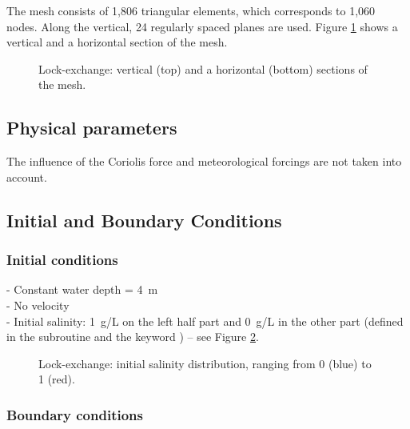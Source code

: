 The mesh consists of 1,806 triangular elements, which corresponds to 1,060 nodes.
Along the vertical, 24 regularly spaced planes are used.
Figure \ref{fig:lock-mesh} shows a vertical and a horizontal section of the mesh.
\begin{figure}[ht]
  \begin{center}
        \caption{Lock-exchange: vertical (top) and a horizontal (bottom) sections of the mesh.}
    \label{fig:lock-mesh}
  \end{center}
\end{figure}

\subsection{Physical parameters}

The influence of the Coriolis force and meteorological forcings
are not taken into account.

\subsection{Initial and Boundary Conditions}

\subsubsection{Initial conditions}

- Constant water depth = 4~m\\
- No velocity\\
- Initial salinity: 1~g/L on the left half part and 0~g/L in the other
part (defined in the subroutine  and the keyword
) -- see Figure \ref{fig:lock-initial_salinity}.
\begin{figure}[ht]
  \begin{center}
        \caption{Lock-exchange: initial salinity distribution, ranging from 0 (blue)
          to 1 (red).}
    \label{fig:lock-initial_salinity}
  \end{center}
\end{figure}

\subsubsection{Boundary conditions}

